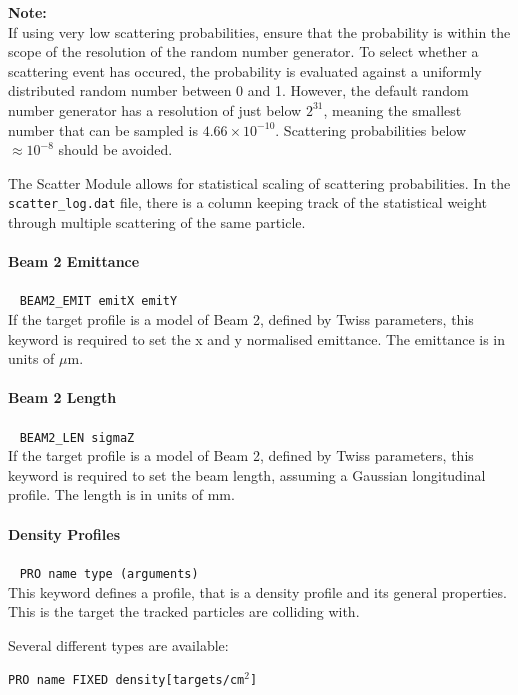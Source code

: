 \bigskip
\noindent\textbf{Note:}\\

If using very low scattering probabilities, ensure that the probability is within the scope of the resolution of the random number generator.
To select whether a scattering event has occured, the probability is evaluated against a uniformly distributed random number between 0 and 1.
However, the default random number generator has a resolution of just below $2^{31}$, meaning the smallest number that can be sampled is $4.66\times 10^{-10}$.
Scattering probabilities below $\approx{10^{-8}}$ should be avoided.

The Scatter Module allows for statistical scaling of scattering probabilities.
In the \texttt{scatter\_log.dat} file, there is a column keeping track of the statistical weight through multiple scattering of the same particle.

\paragraph{Beam 2 Emittance}~ \texttt{BEAM2\_EMIT emitX emitY}\\

If the target profile is a model of Beam 2, defined by Twiss parameters, this keyword is required to set the x and y normalised emittance.
The emittance is in units of $\mu$m.

\paragraph{Beam 2 Length}~ \texttt{BEAM2\_LEN sigmaZ}\\

If the target profile is a model of Beam 2, defined by Twiss parameters, this keyword is required to set the beam length, assuming a Gaussian longitudinal profile.
The length is in units of mm.

\paragraph{Density Profiles}~ \texttt{PRO name type (arguments)} \\

This keyword defines a profile, that is a density profile and its general properties.
This is the target the tracked particles are colliding with.

Several different types are available:

\bigskip
\noindent\texttt{PRO name FIXED density[targets/cm$^2$]}\\

